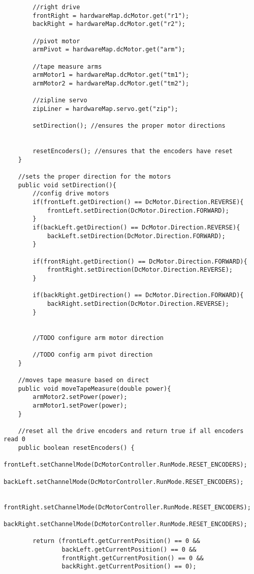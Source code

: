 \documentclass[11pt,fleqn]{article}
\begin{document}
\begin{verbatim}
        //right drive
        frontRight = hardwareMap.dcMotor.get("r1");
        backRight = hardwareMap.dcMotor.get("r2");

        //pivot motor
        armPivot = hardwareMap.dcMotor.get("arm");

        //tape measure arms
        armMotor1 = hardwareMap.dcMotor.get("tm1");
        armMotor2 = hardwareMap.dcMotor.get("tm2");

        //zipline servo
        zipLiner = hardwareMap.servo.get("zip");

        setDirection(); //ensures the proper motor directions


        resetEncoders(); //ensures that the encoders have reset
    }

    //sets the proper direction for the motors
    public void setDirection(){
        //config drive motors
        if(frontLeft.getDirection() == DcMotor.Direction.REVERSE){
            frontLeft.setDirection(DcMotor.Direction.FORWARD);
        }
        if(backLeft.getDirection() == DcMotor.Direction.REVERSE){
            backLeft.setDirection(DcMotor.Direction.FORWARD);
        }

        if(frontRight.getDirection() == DcMotor.Direction.FORWARD){
            frontRight.setDirection(DcMotor.Direction.REVERSE);
        }

        if(backRight.getDirection() == DcMotor.Direction.FORWARD){
            backRight.setDirection(DcMotor.Direction.REVERSE);
        }


        //TODO configure arm motor direction

        //TODO config arm pivot direction
    }

    //moves tape measure based on direct
    public void moveTapeMeasure(double power){
        armMotor2.setPower(power);
        armMotor1.setPower(power);
    }

    //reset all the drive encoders and return true if all encoders read 0
    public boolean resetEncoders() {
        frontLeft.setChannelMode(DcMotorController.RunMode.RESET_ENCODERS);
        backLeft.setChannelMode(DcMotorController.RunMode.RESET_ENCODERS);

        frontRight.setChannelMode(DcMotorController.RunMode.RESET_ENCODERS);
        backRight.setChannelMode(DcMotorController.RunMode.RESET_ENCODERS);

        return (frontLeft.getCurrentPosition() == 0 &&
                backLeft.getCurrentPosition() == 0 &&
                frontRight.getCurrentPosition() == 0 &&
                backRight.getCurrentPosition() == 0);


\end{verbatim}
\end{document}
